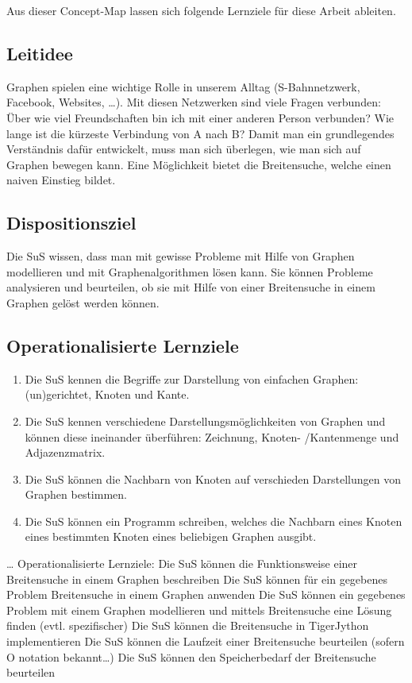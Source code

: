 Aus dieser Concept-Map lassen sich folgende Lernziele für diese Arbeit ableiten. 

\subsection{Leitidee}

Graphen spielen eine wichtige Rolle in unserem Alltag (S-Bahnnetzwerk, Facebook, Websites, \dots). 
Mit diesen Netzwerken sind viele Fragen verbunden: Über wie viel Freundschaften bin ich mit einer anderen Person verbunden? Wie lange ist die kürzeste Verbindung von A nach B?
Damit man ein grundlegendes Verständnis dafür entwickelt, muss man sich überlegen, wie man sich auf Graphen bewegen kann. 
Eine Möglichkeit bietet die Breitensuche, welche einen naiven Einstieg bildet. 


\subsection{Dispositionsziel}

Die SuS wissen, dass man mit gewisse Probleme mit Hilfe von Graphen modellieren und mit Graphenalgorithmen lösen kann. 
Sie können Probleme analysieren und beurteilen, ob sie mit Hilfe von einer Breitensuche in einem Graphen gelöst werden können.



\subsection{Operationalisierte Lernziele}

\begin{enumerate}
\item Die SuS kennen die Begriffe zur Darstellung von einfachen Graphen: (un)gerichtet, Knoten und Kante.

\item Die SuS kennen verschiedene Darstellungsmöglichkeiten von Graphen und können diese ineinander überführen: Zeichnung, Knoten- /Kantenmenge und Adjazenzmatrix.

\item Die SuS können die Nachbarn von Knoten auf verschieden Darstellungen von Graphen bestimmen. 

\item Die SuS können ein Programm schreiben, welches die Nachbarn eines Knoten eines bestimmten Knoten eines beliebigen Graphen ausgibt.
\end{enumerate}


\dots
Operationalisierte Lernziele:
Die SuS können die Funktionsweise einer Breitensuche in einem Graphen beschreiben
Die SuS können für ein gegebenes Problem Breitensuche in einem Graphen anwenden
Die SuS können ein gegebenes Problem mit einem Graphen modellieren und mittels Breitensuche eine Lösung finden (evtl. spezifischer)
Die SuS können die Breitensuche in TigerJython implementieren
Die SuS können die Laufzeit einer Breitensuche beurteilen (sofern O notation bekannt…)
Die SuS können den Speicherbedarf der Breitensuche beurteilen